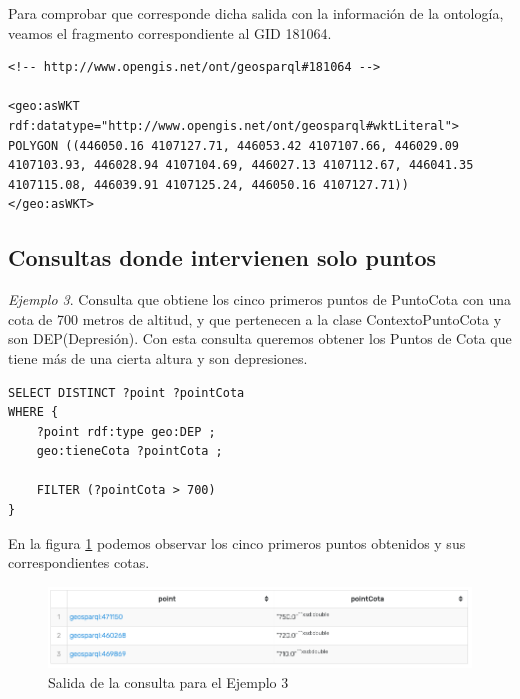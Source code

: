Para comprobar que corresponde dicha salida con la información de la ontología, veamos el fragmento correspondiente al GID 181064.

\vspace*{0.2cm}

\begin{lstlisting}
<!-- http://www.opengis.net/ont/geosparql#181064 -->

<geo:asWKT rdf:datatype="http://www.opengis.net/ont/geosparql#wktLiteral"> POLYGON ((446050.16 4107127.71, 446053.42 4107107.66, 446029.09 4107103.93, 446028.94 4107104.69, 446027.13 4107112.67, 446041.35 4107115.08, 446039.91 4107125.24, 446050.16 4107127.71))
</geo:asWKT>
\end{lstlisting} 

\subsection{Consultas donde intervienen solo puntos}

\textit{Ejemplo 3}. Consulta que obtiene los cinco primeros puntos de PuntoCota con una cota de 700 metros de altitud, y que pertenecen a la clase ContextoPuntoCota y son DEP(Depresión). Con esta consulta queremos obtener los Puntos de Cota que tiene más de una cierta altura y son depresiones.

\vspace*{0.2cm}

\begin{lstlisting}
SELECT DISTINCT ?point ?pointCota
WHERE {
	?point rdf:type geo:DEP ;
	geo:tieneCota ?pointCota ;
	
	FILTER (?pointCota > 700)
}
\end{lstlisting}

\vspace*{0.2cm}

En la figura \ref{fig:salida5} podemos observar los cinco primeros puntos obtenidos y sus correspondientes cotas.

\begin{figure}[H]
	\centering
	\includegraphics[width=1\linewidth]{imagenes/capitulo5/salida5}
	\caption{Salida de la consulta para el Ejemplo 3}
	\label{fig:salida5}
\end{figure}

